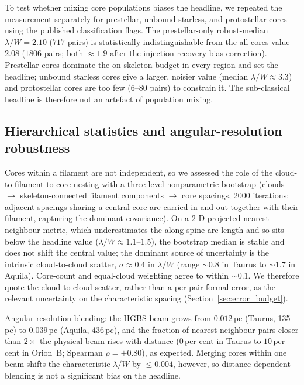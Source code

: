 \documentclass[usenatbib,twoside,twocolumn]{mnras}
\begin{document}
To test whether mixing core populations biases the headline, we repeated the measurement separately for prestellar, unbound starless, and protostellar cores using the published classification flags. The prestellar-only robust-median $\lambda/W=2.10$ ($717$ pairs) is statistically indistinguishable from the all-cores value $2.08$ ($1806$ pairs; both $\approx1.9$ after the injection-recovery bias correction). Prestellar cores dominate the on-skeleton budget in every region and set the headline; unbound starless cores give a larger, noisier value (median $\lambda/W\approx3.3$) and protostellar cores are too few ($6$--$80$ pairs) to constrain it. The sub-classical headline is therefore not an artefact of population mixing.

\subsection{Hierarchical statistics and angular-resolution robustness}

Cores within a filament are not independent, so we assessed the role of the cloud-to-filament-to-core nesting with a three-level nonparametric bootstrap (clouds $\to$ skeleton-connected filament components $\to$ core spacings, 2000 iterations; adjacent spacings sharing a central core are carried in and out together with their filament, capturing the dominant covariance). On a 2-D projected nearest-neighbour metric, which underestimates the along-spine arc length and so sits below the headline value ($\lambda/W\approx1.1$--$1.5$), the bootstrap median is stable and does not shift the central value; the dominant source of uncertainty is the intrinsic cloud-to-cloud scatter, $\sigma\approx0.4$ in $\lambda/W$ (range $\sim0.8$ in Taurus to $\sim1.7$ in Aquila). Core-count and equal-cloud weighting agree to within $\sim0.1$. We therefore quote the cloud-to-cloud scatter, rather than a per-pair formal error, as the relevant uncertainty on the characteristic spacing (Section~\ref{sec:error_budget}).

Angular-resolution blending: the HGBS beam grows from $0.012$\,pc (Taurus, 135\,pc) to $0.039$\,pc (Aquila, 436\,pc), and the fraction of nearest-neighbour pairs closer than $2\times$ the physical beam rises with distance ($0$\,per cent in Taurus to $10$\,per cent in Orion~B; Spearman $\rho=+0.80$), as expected. Merging cores within one beam shifts the characteristic $\lambda/W$ by $\le0.004$, however, so distance-dependent blending is not a significant bias on the headline.
\end{document}

